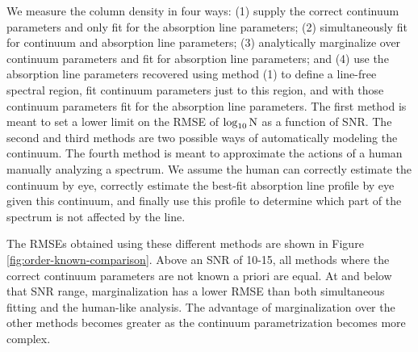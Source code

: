 \documentclass[manuscript]{aastex62}
\begin{document}
We measure the column density in four ways: (1) supply the correct continuum parameters and only fit for the absorption line parameters; (2) simultaneously fit for continuum and absorption line parameters; (3) analytically marginalize over continuum parameters and fit for absorption line parameters; and (4) use the absorption line parameters recovered using method (1) to define a line-free spectral region, fit continuum parameters just to this region, and with those continuum parameters fit for the absorption line parameters.
The first method is meant to set a lower limit on the RMSE of $\log_{10}{\rm N}$ as a function of SNR.
The second and third methods are two possible ways of automatically modeling the continuum.
The fourth method is meant to approximate the actions of a human manually analyzing a spectrum.
We assume the human can correctly estimate the continuum by eye, correctly estimate the best-fit absorption line profile by eye given this continuum, and finally use this profile to determine which part of the spectrum is not affected by the line.

The RMSEs obtained using these different methods are shown in Figure \ref{fig:order-known-comparison}.
Above an SNR of 10-15, all methods where the correct continuum parameters are not known a priori are equal.
At and below that SNR range, marginalization has a lower RMSE than both simultaneous fitting and the human-like analysis.
The advantage of marginalization over the other methods becomes greater as the continuum parametrization becomes more complex.
\end{document}
